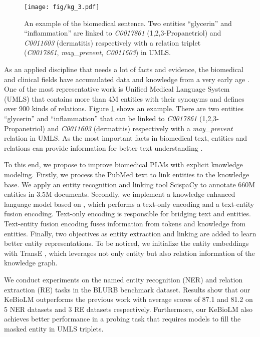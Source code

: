 \documentclass[11pt]{article}
\begin{document}
\begin{figure}[t]
\centering
\texttt{[image: fig/kg\_3.pdf]}
\caption{An example of the biomedical sentence. Two entities ``glycerin'' and ``inflammation'' are linked to \textit{C0017861} (1,2,3-Propanetriol) and \textit{C0011603} (dermatitis) respectively with a relation triplet (\textit{C0017861}, \textit{may\_prevent}, \textit{C0011603}) in UMLS.}
\label{fig:example}
\end{figure}

As an applied discipline that needs a lot of facts and evidence, the biomedical and clinical fields have accumulated data and knowledge from a very early age \cite{ashburner2000gene, stearns2001snomed}. One of the most representative work is Unified Medical Language System (UMLS) \cite{bodenreider2004unified} that contains more than 4M entities with their synonyms and defines over 900 kinds of relations. Figure \ref{fig:example} shows an example. There are two entities ``glycerin'' and ``inflammation'' that can be linked to \textit{C0017861} (1,2,3-Propanetriol) and \textit{C0011603} (dermatitis) respectively with a \textit{may\_prevent} relation in UMLS. As the most important facts in biomedical text, entities and relations can provide information for better text understanding \cite{8377981, yuan2020coder}.

To this end, we propose to improve biomedical PLMs with explicit knowledge modeling. Firstly, we process the PubMed text to link entities to the knowledge base. We apply an entity recognition and linking tool ScispaCy \cite{neumann-etal-2019-scispacy} to annotate 660M entities in 3.5M documents.
Secondly, we implement a knowledge enhanced language model based on \citet{fevry-etal-2020-entities}, which performs a text-only encoding and a text-entity fusion encoding.
Text-only encoding is responsible for bridging text and entities. Text-entity fusion encoding fuses information from tokens and knowledge from entities. Finally, two objectives as entity extraction and linking are added to learn better entity representations.
To be noticed, we initialize the entity embeddings with TransE \cite{bordes2013translating}, which leverages not only entity but also relation information of the knowledge graph.




We conduct experiments on the named entity recognition (NER) and relation extraction (RE) tasks in the BLURB benchmark dataset. Results show that our KeBioLM outperforms the previous work with average scores of 87.1 and 81.2 on 5 NER datasets and 3 RE datasets respectively. Furthermore, our KeBioLM also achieves better performance in a probing task that requires models to fill the masked entity in UMLS triplets. 
\end{document}
